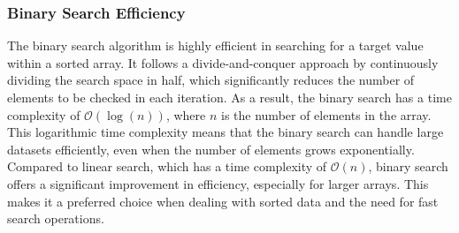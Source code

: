 \subsubsection{Binary Search Efficiency}

The binary search algorithm is highly efficient in searching for a target value within a sorted array. It follows a divide-and-conquer approach by continuously dividing the search space in half, which significantly reduces the number of elements to be checked in each iteration. As a result, the binary search has a time complexity 
of $\mathcal{O}(\log{(n)})$, where $n$ is the number of elements in the array. This logarithmic time complexity means that the binary search can handle large datasets efficiently, even when the number of elements grows exponentially. Compared to linear search, which has a time complexity of $\mathcal{O}(n)$, binary search offers a significant 
improvement in efficiency, especially for larger arrays. This makes it a preferred choice when dealing with sorted data and the need for fast search operations.

